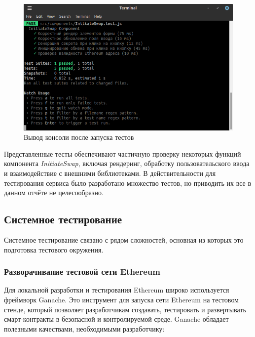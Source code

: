 \begin{figure}[H]
\centering
\includegraphics[scale=0.65]{res/console-out}
\caption{Вывод консоли после запуска тестов}
\label{pic:InitiateSwapTestConsole}
\end{figure}

Представленные тесты обеспечивают частичную проверку некоторых функций компонента \textit{InitiateSwap}, включая рендеринг, обработку пользовательского ввода и взаимодействие с внешними библиотеками. В действительности для тестирования сервиса было разработано множество тестов, но приводить их все в данном отчёте не целесообразно.

\subsection{Системное тестирование}

Системное тестирование связано с рядом сложностей, основная из которых это подготовка тестового окружения.

\subsubsection{Разворачивание тестовой сети Ethereum}

Для локальной разработки и тестирования Ethereum широко используется фреймворк Ganache. Это инструмент для запуска сети Ethereum на тестовом стенде, который позволяет разработчикам создавать, тестировать и развертывать смарт-контракты в безопасной и контролируемой среде. Ganache обладает полезными качествами, необходимыми разработчику:

